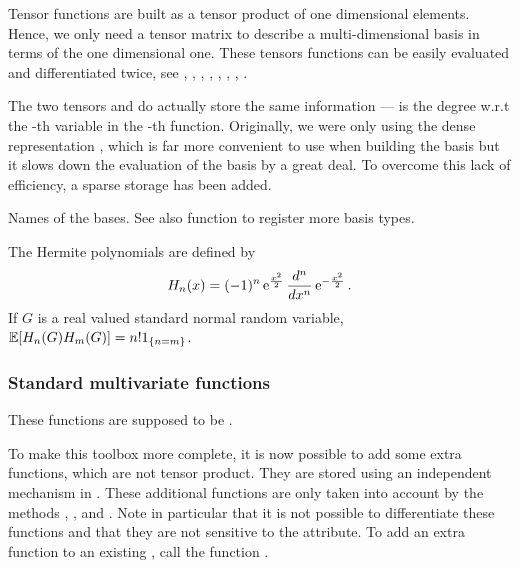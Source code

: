 Tensor functions are built as a tensor product of one dimensional elements. Hence, we only need a tensor matrix  to describe a multi-dimensional basis in terms of the one dimensional one. These tensors functions can be easily evaluated and differentiated twice, see ,
, , ,
, ,
, .

The two tensors  and  do actually store the same information ---  is the degree w.r.t the -th variable in the -th function. Originally, we were only using the dense representation , which is far more convenient to use when building the basis but it slows down the evaluation of the basis by a great deal. To overcome this lack of efficiency, a sparse storage has been added. 

\begin{table}[h!]
  \begin{describeconst}
  \end{describeconst}
  \caption{Names of the bases. See also function
   to register more basis types.}
  \label{basis_index}
\end{table}

The Hermite polynomials are defined by
\begin{equation*}
  H_n(x) = (-1)^n \operatorname{e}^{ \frac{x^2}{2} } \frac{d^n}{dx^n} \operatorname{e}^{ -\frac{x^2}{2} }.
\end{equation*}
If $G$ is a real valued standard normal random variable, ${\mathbb E}[H_n(G) H_m(G)] = n!
1_{\left\{n = m\right\}}$. \\

\subsubsection{Standard multivariate functions}

These functions are supposed to be .

To make this toolbox more complete, it is now possible to add some extra functions, which are not tensor product. They are stored using an independent mechanism in .  These additional functions are only taken into account by the methods , ,  and . Note in particular that it is not possible to differentiate these functions and that they are not sensitive to the  attribute. To add an extra function to an existing , call the function .

